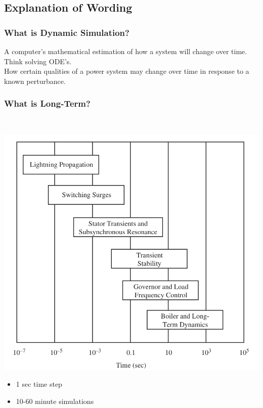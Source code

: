 \documentclass[14pt, unknownkeysallowed]{beamer}
\begin{document}
\subsection{Explanation of Wording}
\begin{frame}
\frametitle{What is Dynamic Simulation?}
A computer's mathematical estimation of how a system will change over time.\\%
\vspace{1em}
Think solving ODE's.\\
\vspace{1em}
How certain qualities of a power system may change over time in response to a known perturbance.
\end{frame}
\begin{frame}
\frametitle{What is Long-Term?}\ \vspace{-1em}
\begin{minipage}{.7\linewidth}
{\centering
{\includegraphics[width=.8\linewidth]{timeScales}} %
}{\footnotesize\cite{SauerPaiChow}} 
\end{minipage}%
\begin{minipage}{.4\linewidth}
\hspace{-1em}
\begin{itemize}
\item 1 sec time step
\item 10-60 minute simulations
\end{itemize}
\end{minipage}


\end{frame}
\end{document}
